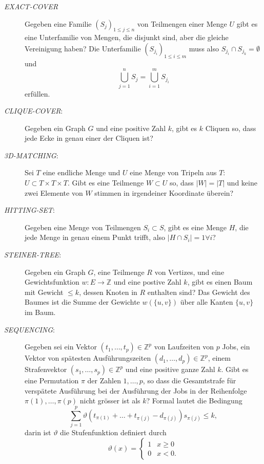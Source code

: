 \begin{description}
\item[\textsl{EXACT-COVER}] Gegeben eine Familie $(S_j)_{1\le j\le n}$
von Teilmengen
einer Menge $U$ gibt es eine Unterfamilie von Mengen, die disjunkt sind,
aber die gleiche Vereinigung haben?
Die Unterfamilie $(S_{j_i})_{1\le i\le m}$ muss also
$S_{j_i}\cap S_{j_k}=\emptyset$ und 
\[
\bigcup_{j=1}^n S_j=\bigcup_{i=1}^mS_{j_i}
\]
erfüllen.
\item[\textsl{CLIQUE-COVER}:] Gegeben ein Graph $G$ und eine positive Zahl
$k$, gibt es $k$ Cliquen so, dass jede Ecke in genau einer der Cliquen ist?
\item[\textsl{3D-MATCHING}:] Sei $T$ eine endliche Menge und $U$ eine 
Menge von Tripeln aus $T$: $U\subset T\times T\times T$.
Gibt es eine
Teilmenge $W\subset U$ so, dass $|W|=|T|$ und keine zwei Elemente
von $W$ stimmen in irgendeiner Koordinate überein?
\item[\textsl{HITTING-SET}:] Gegeben eine Menge von Teilmengen $S_i\subset S$,
gibt es eine Menge $H$, die jede Menge in genau einem Punkt trifft, also
$|H\cap S_i|=1\forall i$?
\item[\textsl{STEINER-TREE}:]
Gegeben ein Graph $G$, eine Teilmenge $R$ von Vertizes, und eine
Gewichtsfunktion $w\colon E\to\mathbb Z$ und eine postive Zahl $k$, gibt es
einen Baum mit Gewicht $\le k$, dessen Knoten in $R$ enthalten sind?
Das Gewicht des Baumes ist die Summe der Gewichte 
$w(\{u,v\})$ über alle Kanten $\{u,v\}$ im Baum.
\item[\textsl{SEQUENCING}:] Gegeben sei ein Vektor
$(t_1,\dots,t_p)\in\mathbb Z^p$
von Laufzeiten von $p$ Jobs, ein Vektor von spätesten Ausführungszeiten 
$(d_1,\dots,d_p)\in\mathbb Z^p$, einem Strafenvektor 
$(s_1,\dots,s_p)\in\mathbb Z^p$ und eine positive ganze Zahl $k$.
Gibt es eine Permutation $\pi$ der Zahlen $1,\dots,p$, so dass
die Gesamtstrafe für verspätete Ausführung bei der Ausführung der Jobs
in der Reihenfolge $\pi(1),\dots,\pi(p)$ nicht grösser ist als $k$? 
Formal lautet die Bedingung
\[
\sum_{j=1}^p
\vartheta(t_{\pi(1)} +\dots +t_{\pi(j)} - d_{\pi(j)}) s_{\pi(j)} \le k,
\]
darin ist $\vartheta$ die Stufenfunktion definiert durch
\[
\vartheta(x)=\begin{cases}
1&x\ge 0\\
0&x<0.
\end{cases}
\]
\end{description}
